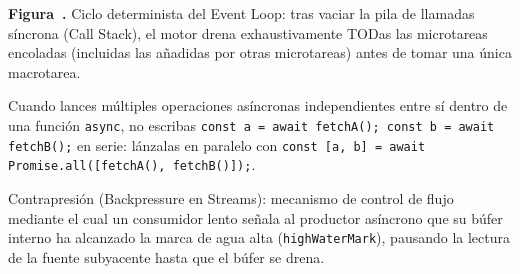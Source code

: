 \documentclass{book}
\newcounter{studiumfigure}
\begin{document}
\begin{minipage}{\linewidth}
%
\fi
\fi
\endgroup
\par\nopagebreak
{\small {}\label{fig:fig-js-event-loop-queues}\textbf{Figura~\thestudiumfigure.} Ciclo determinista del Event Loop: tras vaciar la pila de llamadas síncrona (Call Stack), el motor drena exhaustivamente TODas las microtareas encoladas (incluidas las añadidas por otras microtareas) antes de tomar una única macrotarea.\par}
\end{minipage}
\par\vspace{\baselineskip}

\begin{tcolorbox}[title={Consejo}, studiumtip, breakable]

Cuando lances múltiples operaciones asíncronas independientes entre sí dentro de una función \texttt{async}, no escribas \texttt{const a = await fetchA(); const b = await fetchB();} en serie: lánzalas en paralelo con \texttt{const [a, b] = await Promise.all([fetchA(), fetchB()]);}.
\end{tcolorbox}

\begin{tcolorbox}[title={Definición}, studiumdef, breakable]

Contrapresión (Backpressure en Streams): mecanismo de control de flujo mediante el cual un consumidor lento señala al productor asíncrono que su búfer interno ha alcanzado la marca de agua alta (\texttt{highWaterMark}), pausando la lectura de la fuente subyacente hasta que el búfer se drena.
\end{tcolorbox}
\end{document}
